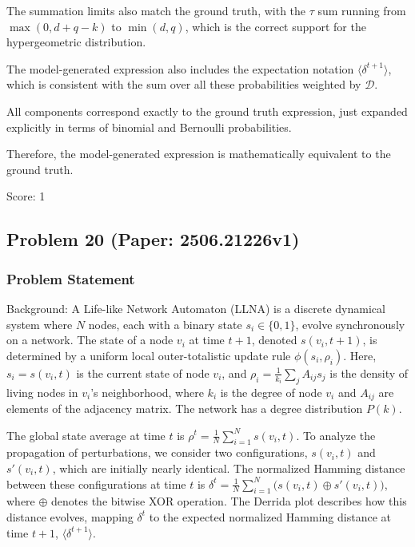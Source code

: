\documentclass[10pt]{article}
\begin{document}
The summation limits also match the ground truth, with the \(\tau\) sum running from \(\max(0, d+q-k)\) to \(\min(d,q)\), which is the correct support for the hypergeometric distribution.

The model-generated expression also includes the expectation notation \(\langle \delta^{t+1} \rangle\), which is consistent with the sum over all these probabilities weighted by \(\mathcal{D}\).

All components correspond exactly to the ground truth expression, just expanded explicitly in terms of binomial and Bernoulli probabilities.

Therefore, the model-generated expression is mathematically equivalent to the ground truth.

Score: 1

\newpage
\subsection*{Problem 20 (Paper: 2506.21226v1)}
\subsubsection*{Problem Statement}
Background:
A Life-like Network Automaton (LLNA) is a discrete dynamical system where $N$ nodes, each with a binary state $s_i \in \{0,1\}$, evolve synchronously on a network. The state of a node $v_i$ at time $t+1$, denoted $s(v_i, t+1)$, is determined by a uniform local outer-totalistic update rule $\phi(s_i, \rho_i)$. Here, $s_i = s(v_i, t)$ is the current state of node $v_i$, and $\rho_i = \frac{1}{k_i}\sum_{j}A_{ij}s_j$ is the density of living nodes in $v_i$'s neighborhood, where $k_i$ is the degree of node $v_i$ and $A_{ij}$ are elements of the adjacency matrix. The network has a degree distribution $P(k)$.

The global state average at time $t$ is $\rho^t = \frac{1}{N}\sum_{i=1}^N s(v_i, t)$. To analyze the propagation of perturbations, we consider two configurations, $s(v_i, t)$ and $s'(v_i, t)$, which are initially nearly identical. The normalized Hamming distance between these configurations at time $t$ is $\delta^t = \frac{1}{N}\sum_{i=1}^N \Big( s(v_i, t) \oplus s'(v_i, t) \Big)$, where $\oplus$ denotes the bitwise XOR operation. The Derrida plot describes how this distance evolves, mapping $\delta^t$ to the expected normalized Hamming distance at time $t+1$, $\langle\delta^{t+1}\rangle$.
\end{document}

